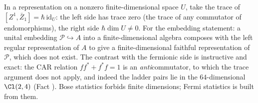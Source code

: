In a representation on a nonzero finite-dimensional space $U$, take the trace of $[Z^1, \bar Z_1] = \hbar\,\mathrm{id}_U$: the left side has trace zero (the trace of any commutator of endomorphisms), the right side $\hbar\dim U \neq 0$. For the embedding statement: a unital embedding $\mathcal{P} \hookrightarrow A$ into a finite-dimensional algebra composes with the left regular representation of $A$ to give a finite-dimensional faithful representation of $\mathcal{P}$, which does not exist. The contrast with the fermionic side is instructive and exact: the CAR relation $ff^* + f^*f = 1$ is an \emph{anti}commutator, to which the trace argument does not apply, and indeed the ladder pairs lie in the $64$-dimensional $\Cl(2,4)$ (Fact ). Bose statistics forbids finite dimensions; Fermi statistics is built from them.
